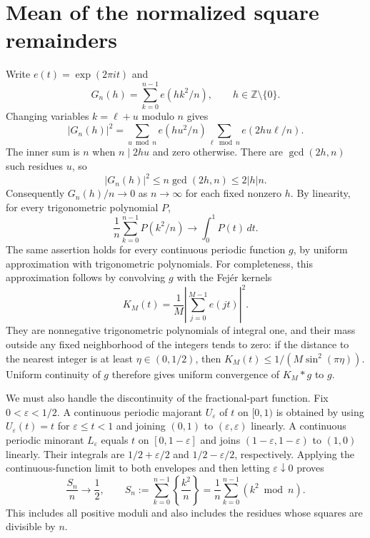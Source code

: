 \documentclass[11pt]{article}
\newcommand{\fr}[1]{\left\{#1\right\}}
\begin{document}
\section*{Mean of the normalized square remainders}
Write $e(t)=\exp(2\pi i t)$ and
\[
 G_n(h)=\sum_{k=0}^{n-1}e(hk^2/n),\qquad h\in\mathbb Z\setminus\{0\}.
\]
Changing variables $k=\ell+u$ modulo $n$ gives
\[
 |G_n(h)|^2
 =\sum_{u\bmod n}e(hu^2/n)\sum_{\ell\bmod n}e(2hu\ell/n).
\]
The inner sum is $n$ when $n\mid2hu$ and zero otherwise. There are
$\gcd(2h,n)$ such residues $u$, so
\begin{equation}\label{eq:gauss}
 |G_n(h)|^2\le n\gcd(2h,n)\le2|h|n.
\end{equation}
Consequently $G_n(h)/n\to0$ as $n\to\infty$ for each fixed nonzero $h$.
By linearity, for every trigonometric polynomial $P$,
\[
 \frac1n\sum_{k=0}^{n-1}P(k^2/n)\longrightarrow\int_0^1P(t)\,dt.
\]
The same assertion holds for every continuous periodic function $g$,
by uniform approximation with trigonometric polynomials.
For completeness, this approximation follows by convolving $g$ with
the Fej\'er kernels
\[
 K_M(t)=\frac1M\left|\sum_{j=0}^{M-1}e(jt)\right|^2.
\]
They are nonnegative trigonometric polynomials of integral one, and
their mass outside any fixed neighborhood of the integers tends to zero:
if the distance to the nearest integer is at least $\eta\in(0,1/2)$,
then $K_M(t)\le1/(M\sin^2(\pi\eta))$.
Uniform continuity of $g$ therefore gives uniform convergence of
$K_M*g$ to $g$.

We must also handle the discontinuity of the fractional-part function.
Fix $0<\varepsilon<1/2$. A continuous periodic majorant $U_\varepsilon$
of $t$ on $[0,1)$ is obtained by using $U_\varepsilon(t)=t$ for
$\varepsilon\le t<1$ and joining $(0,1)$ to $(\varepsilon,\varepsilon)$
linearly. A continuous periodic minorant $L_\varepsilon$ equals $t$ on
$[0,1-\varepsilon]$ and joins $(1-\varepsilon,1-\varepsilon)$ to $(1,0)$
linearly. Their integrals are $1/2+\varepsilon/2$ and
$1/2-\varepsilon/2$, respectively. Applying the continuous-function
limit to both envelopes and then letting $\varepsilon\downarrow0$ proves
\begin{equation}\label{eq:mean}
 \frac{S_n}{n}\longrightarrow\frac12,\qquad
 S_n:=\sum_{k=0}^{n-1}\fr{\frac{k^2}{n}}
     =\frac1n\sum_{k=0}^{n-1}(k^2\bmod n).
\end{equation}
This includes all positive moduli and also includes the residues whose
squares are divisible by $n$.
\end{document}
